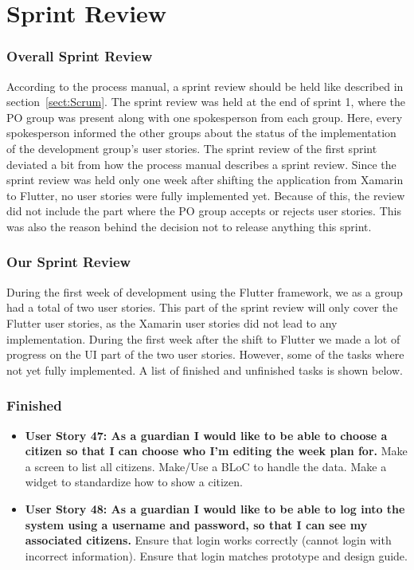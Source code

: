 \section{Sprint Review}
\subsubsection{Overall Sprint Review}
According to the process manual, a sprint review should be held like described in section~\ref{sect:Scrum}.
The sprint review was held at the end of sprint 1, where the PO group was present along with one spokesperson from each group. 
Here, every spokesperson informed the other groups about the status of the implementation of the development group's user stories.
The sprint review of the first sprint deviated a bit from how the process manual describes a sprint review. Since the sprint review was held only one week after shifting the application from Xamarin to Flutter, no user stories were fully implemented yet. Because of this, the review did not include the part where the PO group accepts or rejects user stories. This was also the reason behind the decision not to release anything this sprint.

\subsubsection{Our Sprint Review}
During the first week of development using the Flutter framework, we as a group had a total of two user stories. This part of the sprint review will only cover the Flutter user stories, as the Xamarin user stories did not lead to any implementation.
During the first week after the shift to Flutter we made a lot of progress on the UI part of the two user stories. However, some of the tasks where not yet fully implemented. A list of finished and unfinished tasks is shown below.

\subsubsection{Finished}
\begin{itemize}
    \item \textbf{User Story 47: As a guardian I would like to be able to choose a citizen so that I can choose who I’m editing the week plan for.}
    \subitem Make a screen to list all citizens.
    \subitem Make/Use a BLoC to handle the data.
    \subitem Make a widget to standardize how to show a citizen.
    
    \item \textbf{User Story 48: As a guardian I would like to be able to log into the system using a username and password, so that I can see my associated citizens.}
    \subitem Ensure that login works correctly (cannot login with incorrect information).
    \subitem Ensure that login matches prototype and design guide.
\end{itemize}

